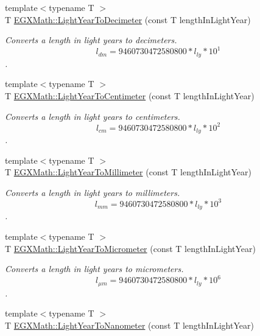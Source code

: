 \begin{DoxyCompactItemize}
{\footnotesize template$<$typename T $>$ }\\T \mbox{\hyperlink{group___e_g_x_math-_conversions-_length_conversions-_astronomical-_light_year-_s_i_ga62936f6c3e97506e1c7a818b61ab90c9}{E\+G\+X\+Math\+::\+Light\+Year\+To\+Decimeter}} (const T length\+In\+Light\+Year)
\begin{DoxyCompactList}\small\item\em Converts a length in light years to decimeters. \[ l_{dm}=9460730472580800 * l_{ly} * 10^{1} \]. \end{DoxyCompactList}\item 
{\footnotesize template$<$typename T $>$ }\\T \mbox{\hyperlink{group___e_g_x_math-_conversions-_length_conversions-_astronomical-_light_year-_s_i_ga25de36bdf4c3baef9594a03a8c986957}{E\+G\+X\+Math\+::\+Light\+Year\+To\+Centimeter}} (const T length\+In\+Light\+Year)
\begin{DoxyCompactList}\small\item\em Converts a length in light years to centimeters. \[ l_{cm}=9460730472580800 * l_{ly} * 10^{2} \]. \end{DoxyCompactList}\item 
{\footnotesize template$<$typename T $>$ }\\T \mbox{\hyperlink{group___e_g_x_math-_conversions-_length_conversions-_astronomical-_light_year-_s_i_ga667fa52ea9719ece8243c50376499c78}{E\+G\+X\+Math\+::\+Light\+Year\+To\+Millimeter}} (const T length\+In\+Light\+Year)
\begin{DoxyCompactList}\small\item\em Converts a length in light years to millimeters. \[ l_{mm}=9460730472580800 * l_{ly} * 10^{3} \]. \end{DoxyCompactList}\item 
{\footnotesize template$<$typename T $>$ }\\T \mbox{\hyperlink{group___e_g_x_math-_conversions-_length_conversions-_astronomical-_light_year-_s_i_gaa3dbed351199e0c91fb3e72aea833233}{E\+G\+X\+Math\+::\+Light\+Year\+To\+Micrometer}} (const T length\+In\+Light\+Year)
\begin{DoxyCompactList}\small\item\em Converts a length in light years to micrometers. \[ l_{\mu m}=9460730472580800 * l_{ly} * 10^{6} \]. \end{DoxyCompactList}\item 
{\footnotesize template$<$typename T $>$ }\\T \mbox{\hyperlink{group___e_g_x_math-_conversions-_length_conversions-_astronomical-_light_year-_s_i_ga1e2666960159c36972f39a0630389b4e}{E\+G\+X\+Math\+::\+Light\+Year\+To\+Nanometer}} (const T length\+In\+Light\+Year)

\end{DoxyCompactItemize}
